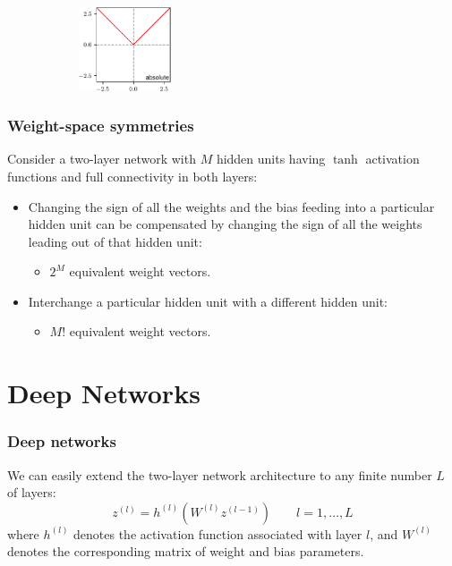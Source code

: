 \documentclass{beamer}
\begin{document}
\begin{frame}
\begin{figure}
\begin{subfigure}{0.8\textwidth}
            \includegraphics[width=0.3\textwidth]{Figure_12_f.pdf}
        \end{subfigure}
    \end{figure}
\end{frame}

\begin{frame}
    \frametitle{Weight-space symmetries}
    Consider a two-layer network with $M$ hidden units having $\tanh$ activation functions and full connectivity in both layers:
    \begin{itemize}
        \item Changing the sign of all the weights and the bias feeding into a particular hidden unit can be compensated by changing the sign of all the weights leading out of that hidden unit:
        \begin{itemize}
            \item $2^{M}$ equivalent weight vectors.
        \end{itemize}
        \item Interchange a particular hidden unit with a different hidden unit:
        \begin{itemize}
            \item $M!$ equivalent weight vectors.
        \end{itemize}
    \end{itemize}
\end{frame}

\section{Deep Networks}

\begin{frame}
    \frametitle{Deep networks}
    We can easily extend the two-layer network architecture to any finite number $L$ of layers:
    \begin{equation*}
        z^{(l)}=h^{(l)}(W^{(l)}z^{(l-1)})\qquad{}l=1,\hdots,L
    \end{equation*}
    where $h^{(l)}$ denotes the activation function associated with layer $l$, and $W^{(l)}$ denotes the corresponding matrix of weight and bias parameters.
\end{frame}
\end{document}
